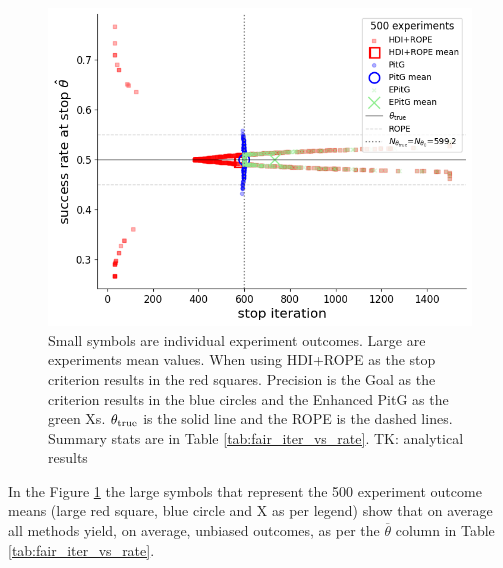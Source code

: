\documentclass{article}
\begin{document}
\begin{figure}[h!]
  \centering
  \includegraphics[width=1\textwidth]{fair_experiments_iter_vs_rate.png}
  \caption{Small symbols are individual experiment outcomes. Large are experiments
  mean values. When using HDI+ROPE as the stop criterion results in the red squares.
  Precision is the Goal as the criterion results in the blue circles
  and the Enhanced PitG as the green Xs. $\theta_{\rm true}$ is the solid line and
  the ROPE is the dashed lines. Summary stats are in Table \ref{tab:fair_iter_vs_rate}. TK: analytical results
  }
  \label{fig:fair_iter_vs_rate}
\end{figure}

In the Figure \ref{fig:fair_iter_vs_rate} the large symbols that represent the 500 experiment outcome means 
(large red square, blue circle and X as per legend) show
that on average all methods yield, on average, unbiased outcomes, as per the
$\overline{\theta}$ column in Table \ref{tab:fair_iter_vs_rate}.
\end{document}
